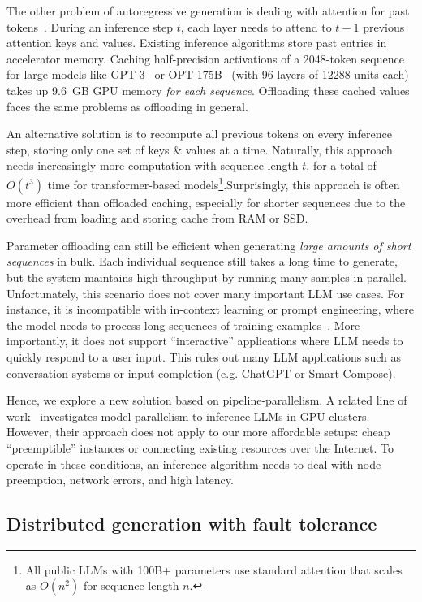The other problem of autoregressive generation is dealing with attention for past tokens~\citep{transformer}. During an inference step $t$, each layer needs to attend to $t - 1$ previous attention keys and values. Existing inference algorithms store past entries in accelerator memory. Caching half-precision activations of a 2048-token sequence for large models like GPT-3~\citep{gpt3} or OPT-175B~\citep{opt} (with 96 layers of 12288 units each) takes up 9.6~GB GPU memory \textit{for each sequence}. Offloading these cached values faces the same problems as offloading in general.

An alternative solution is to recompute all previous tokens on every inference step, storing only one set of keys \& values at a time.
Naturally, this approach needs increasingly more computation with sequence length $t$, for a total of $O(t^3)$ time for transformer-based models\footnote{All public LLMs with 100B+ parameters use standard attention that scales as $O(n^2)$ for sequence length $n$.}.Surprisingly, this approach is often more efficient than offloaded caching, especially for shorter sequences due to the overhead from loading and storing cache from RAM or SSD.

Parameter offloading can still be efficient when generating \textit{large amounts of short sequences} in bulk. Each individual sequence still takes a long time to generate, but the system maintains high throughput by running many samples in parallel.
Unfortunately, this scenario does not cover many important LLM use cases. For instance, it is incompatible with in-context learning or prompt engineering, where the model needs to process long sequences of training examples~\citep{gpt3}. More importantly, it does not support ``interactive'' applications where LLM needs to quickly respond to a user input. This rules out many LLM applications such as conversation systems or input completion (e.g. ChatGPT or Smart Compose).

Hence, we explore a new solution based on pipeline-parallelism. A related line of work~\citep{ds_inference} investigates model parallelism to inference LLMs in GPU clusters. However, their approach does not apply to our more affordable setups: cheap ``preemptible'' instances or connecting existing resources over the Internet. To operate in these conditions, an inference algorithm needs to deal with node preemption, network errors, and high latency.

\subsection{Distributed generation with fault tolerance}\label{sect:method_algorithm}

